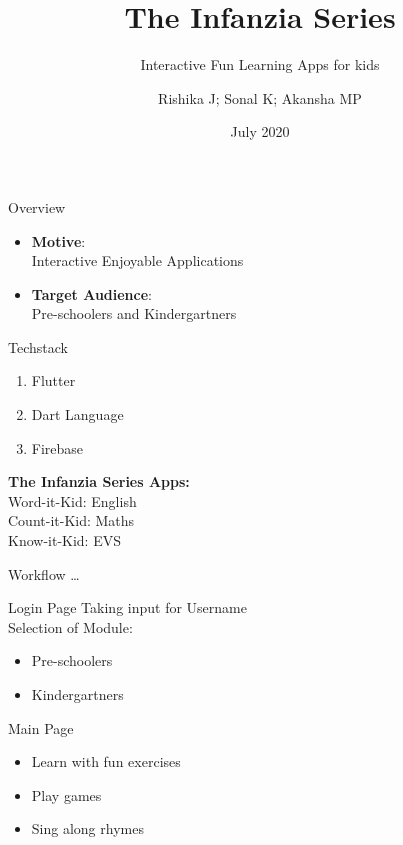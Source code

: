 \documentclass[14pt]{beamer}
\title[SlideSpeak]{The Infanzia Series}
\subtitle{Interactive Fun Learning Apps for kids}
\author[Team 16]{Rishika J; Sonal K; Akansha MP}
\date{July 2020}
\begin{document}
\begin{frame}
    \titlepage
\end{frame}

\begin{frame}{Overview}
    \pause
    \begin{itemize}
    \item \textbf{Motive}: \\
            Interactive Enjoyable Applications
        \pause
    \item \textbf{Target Audience}: \\
            Pre-schoolers and Kindergartners
    \end{itemize}
\end{frame}

\begin{frame}{Techstack}
    \pause
    \begin{enumerate}
        \item Flutter
        \item Dart Language
        \item Firebase  
    \end{enumerate}
\end{frame}

\begin{frame}
    \textbf{The Infanzia Series Apps:} \\ 
    \pause
    \alert{Word-it-Kid: English} \\
    \pause
    \alert{Count-it-Kid: Maths} \\
    \pause
    \alert{Know-it-Kid: EVS} 
\end{frame}

\begin{frame}[standout]
    \alert{Workflow \ldots}
\end{frame}

\begin{frame}{Login Page}
    \pause
    Taking input for Username \\
    \pause
    Selection of Module: \\
    \begin{itemize}
        \item Pre-schoolers
        \item Kindergartners
    \end{itemize}
\end{frame}

\begin{frame}{Main Page}
    \begin{itemize}
            \pause
        \item Learn with fun exercises \\
            \pause
        \item Play games \\
            \pause
        \item Sing along rhymes
    \end{itemize}
\end{frame}
\end{document}
